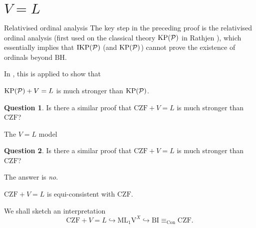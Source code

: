 \documentclass{beamer}
\theoremstyle{definition}
\newtheorem{question}{Question}
\newcommand{\CZF}{\mathrm{CZF}}
\newcommand{\IKP}{\mathrm{IKP}}
\newcommand{\IKPP}{\IKP\mleft(\mathcal{P}\mright)}
\begin{document}
\section{\texorpdfstring{$V = L$}{V=L}}

\begin{frame}{Relativised ordinal analysis}
  The key step in the preceding proof is the relativised ordinal analysis (first used on the classical theory $\mathrm{KP}\mleft(\mathcal{P}\mright)$ in Rathjen \cite{rathjen14-power-kp}), which essentially implies that $\IKPP$ (and $\mathrm{KP}\mleft(\mathcal{P}\mright)$) cannot prove the existence of ordinals beyond $\text{BH}$.

  \vspace{1em}
  In \cite{rathjen20-power-kp-choice}, this is applied to show that
  \begin{theorem}[Rathjen, 2020]
    $\mathrm{KP}\mleft(\mathcal{P}\mright) + V = L$ is much stronger than $\mathrm{KP}\mleft(\mathcal{P}\mright)$.
  \end{theorem}

  \pause

  \begin{question}
    Is there a similar proof that $\CZF + V = L$ is much stronger than $\CZF$?
  \end{question}
\end{frame}

\begin{frame}{The $V = L$ model}
  \begin{question}
    Is there a similar proof that $\CZF + V = L$ is much stronger than $\CZF$?
  \end{question}

  \vspace{0.6em}
  The answer is \emph{no}.

  \begin{theorem}[W.]
    $\CZF + V = L$ is equi-consistent with $\CZF$.
  \end{theorem}

  \pause

  \vspace{0.6em}
  We shall sketch an interpretation
  \[\CZF + V = L \hookrightarrow \mathrm{ML}_1\mathrm{V}^X \hookrightarrow \mathrm{BI} \equiv_{\mathrm{Con}} \CZF.\]
\end{frame}
\end{document}
